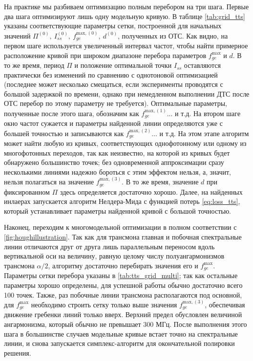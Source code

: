 \documentclass[14pt, a4paper]{extreport}
\numberwithin{equation}{section}
\begin{document}
	На практике мы разбиваем оптимизацию полным перебором на три шага. Первые два шага оптимизируют лишь одну модельную кривую. В таблице \autoref{tab:grid_tts} указаны соответствующие параметры сетки, построенной для начальных значений $\Pi^{(0)},\ I_{ss}^{(0)},\ f_{ge}^{\text{max}, (0)},\ d^{(0)}$, полученных из ОТС. Как видно, на первом шаге используется увеличенный интервал частот, чтобы найти примерное расположение кривой при широком диапазоне перебора параметров $f_{ge}^\text{max}$ и $d$. В то же время, период $\Pi$ и положение оптимальной точки $I_{ss}$ оставляются практически без изменений по сравнению с однотоновой оптимизацией (последнее может несколько смещаться, если эксперименты проводятся с большой задержкой по времени, однако при немедленном выполнении ДТС после ОТС перебор по этому параметру не требуется). Оптимальные параметры, полученные после этого шага, обозначим как $f_{ge}^{\text{max},(1)}...$ и т.д. На втором шаге окно частот сужается и параметры найденной линии определяются уже с большей точностью и записываются как $f_{ge}^{\text{max}, (2)}...$ и т.д. На этом этапе алгоритм может найти любую из кривых, соответствующих однофотонному или одному из многофотонных переходов, так как неизвестно, на которой из кривых будет обнаружено большинство точек; без одновременной аппроксимации сразу несколькими линиями надежно бороться с этим эффектом нельзя, а, значит, нельзя полагаться на значение $f_{ge}^{\text{max}, (3)}$. В то же время, значение $d$ при фиксированном $\Pi$ здесь определяется достаточно хорошо. Далее, на найденных инлаерах запускается алгоритм Нелдера-Мида с функцией потерь \eqref{eq:loss_tts}, который устанавливает параметры найденной кривой с большой точностью.
		
	Наконец, переходим к многомодельной оптимизации в полном соответствии с \autoref{fig:houghillustration}. Так как для трансмона главная и побочная спектральные линии отличаются друг от друга лишь параллельным переносом вдоль вертикальной оси \cite{fedorov2017} на величину, равную целому числу полуангармонизмов трансмона $\alpha/2$, алгоритму достаточно перебирать значения его и $f_{ge}^\text{max}$. Параметры сетки перебора указаны в \autoref{tab:tts_grid_multi}; так как остальные параметры хорошо определены, для успешной работы обычно достаточно всего 100 точек. Также, раз побочные линии трансмона располагаются под основной, для $f_{ge}^\text{max}$ необходимо строить сетку только выше значения $f_{ge}^{\text{max}, (3)}$, обеспечивая движение гребенки линий только вверх. Верхний предел обусловлен величиной ангармонизма, который обычно не превышает 300 МГц. После выполнения этого шага в большинстве случаев модельные кривые встает точно на спектральные линии, и снова запускается симплекс-алгоритм для окончательной полировки решения.
		
\end{document}
